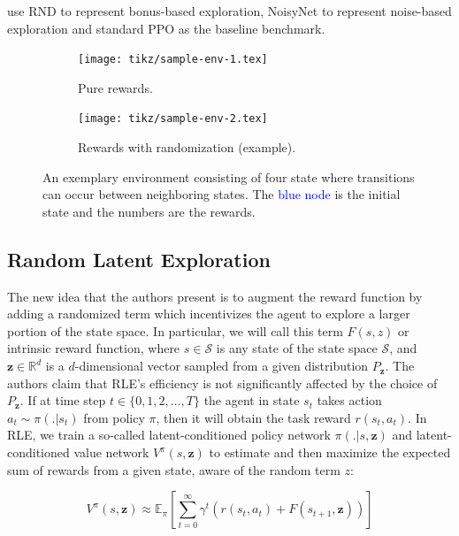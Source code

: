 \documentclass[10pt]{article} %
\begin{document}
\noindent \cite{rle-paper} use RND to represent bonus-based exploration, NoisyNet to represent noise-based exploration and standard PPO as the baseline benchmark.

\begin{figure}[h!]
  \centering
  \begin{subfigure}[b]{0.45\textwidth}
    \centering
    \texttt{[image: tikz/sample-env-1.tex]}
    \caption{Pure rewards.}
    \label{fig:sample-env-1}
  \end{subfigure}
  \hfill
  \begin{subfigure}[b]{0.45\textwidth}
    \centering
    \texttt{[image: tikz/sample-env-2.tex]}
    \caption{Rewards with randomization (example).}
    \label{fig:sample-env-2}
  \end{subfigure}
  
  \caption{An exemplary environment consisting of four state where transitions can occur between neighboring states. The \textcolor{blue}{blue node} is the initial state and the numbers are the rewards.}
  \label{fig:sample-env}
\end{figure}

\subsection{Random Latent Exploration}

\noindent The new idea that the authors \cite{rle-paper} present is to augment the reward function by adding a randomized term which incentivizes the agent to explore a larger portion of the state space. In particular, we will call this term $F(s, z)$ or intrinsic reward function, where $s \in \mathcal{S}$ is any state of the state space $\mathcal{S}$, and $\textbf{z} \in \mathbb{R}^{d}$ is a $d$-dimensional vector sampled from a given distribution $P_{\textbf{z}}$. The authors \cite{rle-paper} claim that RLE's efficiency is not significantly affected by the choice of $P_{\textbf{z}}$. If at time step $t \in \{0, 1, 2, ..., T\}$ the agent in state $s_{t}$ takes action $a_{t} \sim \pi(. | s_{t})$ from policy $\pi$, then it will obtain the task reward $r (s_{t}, a_{t})$. In RLE, we train a so-called latent-conditioned policy network $\pi(. | s, \textbf{z})$ and latent-conditioned value network $V^{\pi}(s, \textbf{z})$ to estimate and then maximize the expected sum of rewards from a given state, aware of the random term $z$:

\begin{equation}
    V^{\pi}(s, \textbf{z}) \approx \mathbb{E}_{\pi} \left[\sum_{t = 0}^{\infty} \gamma^{t} \left(r(s_{t}, a_{t}) + F(s_{t+1}, \textbf{z})\right) \right]
    \label{eq:value_func}
\end{equation}
\end{document}
